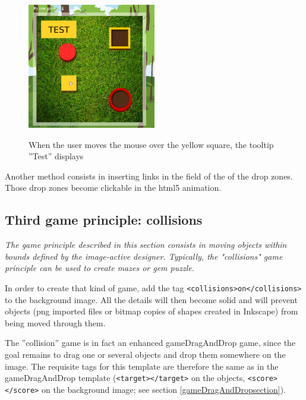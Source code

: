\begin{figure}[htp]
 \centering
 \caption{When the user moves the mouse over the yellow square, the tooltip ''Test'' displays}
 \includegraphics[width=0.5\textwidth]{images/tooltip_example}
 \label{tooltip_example}
\end{figure}

Another method consists in inserting links in the  field of the  
of the drop zones. Those drop zones become clickable in the html5 animation.

\subsection{Third game principle: collisions}

\textit{The game principle described in this section consists in moving objects
within bounds defined by the image-active designer. Typically, the "collisions" game principle
can be used to create mazes or gem puzzle.}




In order to create that kind of game, add the tag \verb|<collisions>on</collisions>| to the 
background image. All the details will then become solid and will prevent objects 
(png imported files or bitmap copies of shapes created in Inkscape) from being moved through them.

The ''collision'' game is in fact an enhanced gameDragAndDrop game, since the goal remains to 
drag one or several objects and drop them somewhere on the image.
The requisite tags for this template are 
therefore the same as in the gameDragAndDrop template (\verb|<target></target>| on the objects, \verb|<score></score>| 
on the background image; see section \ref{gameDragAndDropsection}).

